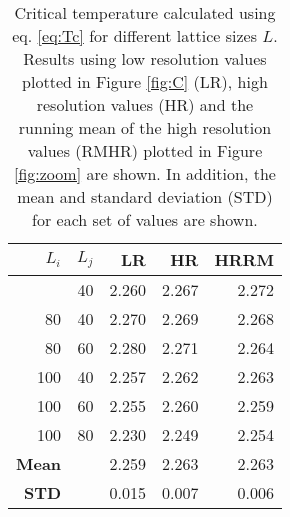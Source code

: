 \begin{table}[]
	\centering
	\begin{tabular}{rrrrr}
		$L_i$         & $L_j$ & LR  & HR & HRRM \\
		\hline
		\addlinespace[0.1cm]
		60            & 40    & 2.260 & 2.267 & 2.272     \\
		80            & 40    & 2.270 & 2.269 & 2.268     \\
		80            & 60    & 2.280 & 2.271 & 2.264     \\
		100           & 40    & 2.257 & 2.262 & 2.263     \\
		100           & 60    & 2.255 & 2.260 & 2.259     \\
		100           & 80    & 2.230 & 2.249 & 2.254     \\
		\hline
		\addlinespace[0.1cm]
		\textbf{Mean} &       & 2.259 & 2.263 & 2.263     \\
		\textbf{STD}  &       & 0.015 & 0.007 & 0.006    
	\end{tabular}
	\caption{Critical temperature calculated using eq. \ref{eq:Tc} for different lattice sizes $L$. Results using low resolution values plotted in Figure \ref{fig:C} (LR), high resolution values (HR) and the running mean of the high resolution values (RMHR) plotted in Figure \ref{fig:zoom} are shown. In addition, the mean and standard deviation (STD) for each set of values are shown.}
	\label{tab:Tc}
\end{table}
